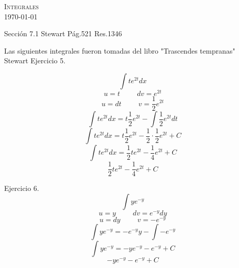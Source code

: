\documentclass{amsart}
\begin{document}
    \begin{center}
        \textsc{ Integrales} \\
        \today
    \end{center}
    \begin{flushleft}
        Sección 7.1 Stewart Pág.521 Res.1346
    \end{flushleft}
    Las siguientes integrales fueron tomadas del libro "Trascendes tempranas" Stewart
    Ejercicio 5.
    
    \[\int te^{2t} dx\]
    \[ u = t \hspace{1cm} dv=e^{2t}\]
    \[ u = dt \hspace{1cm} v = \frac{1}{2}e^{2t}\]
    \[\int te^{2t} dx = t\frac{1}{2}e^{2t} - \int \frac{1}{2}e^{2t} dt\]
    \[\int te^{2t} dx = t\frac{1}{2}e^{2t} - \frac{1}{2}\cdot\frac{1}{2}e^{2t} + C\]
    \[\int te^{2t} dx = \frac{1}{2}te^{2t} - \frac{1}{4}e^{2t} + C\]
    \[\frac{1}{2}te^{2t} - \frac{1}{4}e^{2t} + C\]
    
    Ejercicio 6.
    \[\int ye^{-y}\]
    \[u = y \hspace{1cm} dv = e^{-y} dy\]
    \[u = dy \hspace{1cm} v = -e^{-y}\]
    \[\int ye^{-y} = -e^{-y}y - \int -e^{-y}\]
    \[\int ye^{-y} = -ye^{-y} -e^{-y} + C\]
    \[-ye^{-y} -e^{-y} + C\]
    
    
\end{document}
